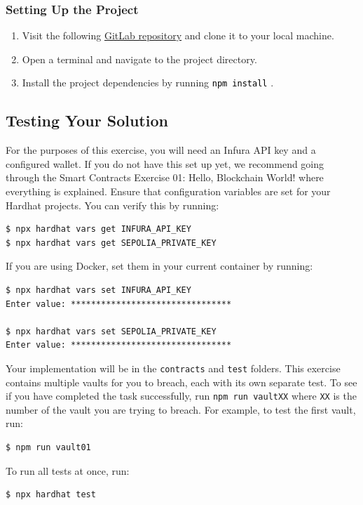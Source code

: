 \documentclass[12pt]{article}
\newcommand{\codegrey}[1]{%
  \texttt{\colorbox{black!4}{\textcolor{black}{#1}}}%
}
\begin{document}
\subsubsection*{Setting Up the Project}

\begin{enumerate}
    \item Visit the following
          \href{https://gitlab.fel.cvut.cz/radovluk/smart-contracts-exercises/-/tree/main/04-Unbreakable-Vault/task/task-code}{GitLab
              repository} and clone it to your local machine.
    \item Open a terminal and navigate to the project directory.
    \item Install the project dependencies by running \codegrey{npm install}.
\end{enumerate}

\subsection{Testing Your Solution}

For the purposes of this exercise, you will need an Infura API key and a
configured wallet. If you do not have this set up yet, we recommend going
through the Smart Contracts Exercise 01: Hello, Blockchain World! where
everything is explained. Ensure that configuration variables are set for your
Hardhat projects. You can verify this by running:

\begin{verbatim}
$ npx hardhat vars get INFURA_API_KEY
$ npx hardhat vars get SEPOLIA_PRIVATE_KEY
\end{verbatim}

\noindent
If you are using Docker, set them in your current container by running:

\begin{verbatim}
$ npx hardhat vars set INFURA_API_KEY
Enter value: ********************************

$ npx hardhat vars set SEPOLIA_PRIVATE_KEY
Enter value: ********************************
\end{verbatim}

Your implementation will be in the \texttt{contracts} and \texttt{test}
folders. This exercise contains multiple vaults for you to breach, each with
its own separate test. To see if you have completed the task successfully, run
\texttt{npm run vaultXX} where \texttt{XX} is the number of the vault you are
trying to breach. For example, to test the first vault, run:
\begin{verbatim}
$ npm run vault01
\end{verbatim}
To run all tests at once, run:
\begin{verbatim}
$ npx hardhat test
\end{verbatim}
\end{document}
